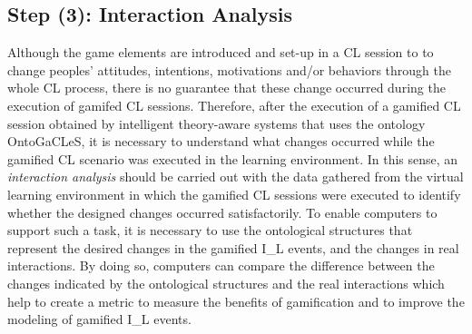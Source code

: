 \subsection{Step (3): Interaction Analysis}

Although the game elements are introduced and set-up in a CL session to to change peoples’ attitudes, intentions, motivations and/or behaviors through the whole CL process, there is no guarantee that these change occurred during the execution of gamifed CL sessions.
Therefore, after the execution of a gamified CL session obtained by intelligent theory-aware systems that uses the ontology OntoGaCLeS, it is necessary to understand what changes occurred while the gamified CL scenario was executed in the learning environment.
In this sense, an \emph{interaction analysis} should be carried out with the data gathered from the virtual learning environment in which the gamified CL sessions were executed to identify whether the designed changes occurred satisfactorily.
To enable computers to support such a task, it is necessary to use the ontological structures that represent the desired changes in the gamified I\_L events, and the changes in real interactions.
By doing so, computers can compare the difference between the changes indicated by the ontological structures and the real interactions which help to create a metric to measure the benefits of gamification and to improve the modeling of gamified I\_L events.


 


